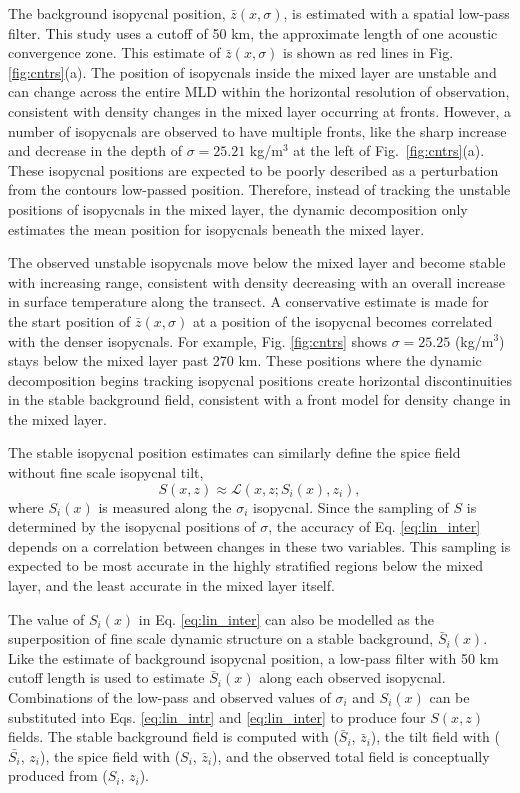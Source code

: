 \documentclass[preprint,NumberedRefs]{JASA}
\begin{document}
The background isopycnal position, $\bar{z}(x, \sigma)$, is estimated with a spatial low-pass filter. This study uses a cutoff of 50 km, the approximate length of one acoustic convergence zone\cite{jensen2011computational}. This estimate of $\bar{z}(x, \sigma)$ is shown as red lines in Fig. \ref{fig:cntrs}(a). The position of isopycnals inside the mixed layer are unstable and can change across the entire MLD within the horizontal resolution of observation, consistent with density changes in the mixed layer occurring at fronts. However, a number of isopycnals are observed to have multiple fronts, like the sharp increase and decrease in the depth of $\sigma=25.21$ kg/m$^3$ at the left of Fig.~\ref{fig:cntrs}(a). These isopycnal positions are expected to be poorly described as a perturbation from the contours low-passed position. Therefore, instead of tracking the unstable positions of isopycnals in the mixed layer, the dynamic decomposition only estimates the mean position for isopycnals beneath the mixed layer.

The observed unstable isopycnals move below the mixed layer and become stable with increasing range, consistent with density decreasing with an overall increase in surface temperature along the transect. A conservative estimate is made for the start position of $\bar{z}(x, \sigma)$ at a position of the isopycnal becomes correlated with the denser isopycnals. For example, Fig. \ref{fig:cntrs} shows $\sigma=25.25$ (kg/m$^3$) stays below the mixed layer past 270 km. These positions where the dynamic decomposition begins tracking isopycnal positions create horizontal discontinuities in the stable background field, consistent with a front model for density change in the mixed layer.

The stable isopycnal position estimates can similarly define the spice field without fine scale isopycnal tilt,
\begin{equation}
    S(x, z)\approx\mathcal{L}(x, z; S_i(x), z_i),
    \label{eq:lin_inter}
\end{equation}
where $S_i(x)$ is measured along the $\sigma_i$ isopycnal. Since the sampling of $S$ is determined by the isopycnal positions of $\sigma$, the accuracy of Eq. \eqref{eq:lin_inter} depends on a correlation between changes in these two variables. This sampling is expected to be most accurate in the highly stratified regions below the mixed layer, and the least accurate in the mixed layer itself.

The value of $S_i(x)$ in Eq. \eqref{eq:lin_inter} can also be modelled as the superposition of fine scale dynamic structure on a stable background, $\bar{S}_i(x)$. Like the estimate of background isopycnal position, a low-pass filter with 50 km cutoff length is used to estimate $\bar{S}_i(x)$ along each observed isopycnal. Combinations of the low-pass and observed values of $\sigma_i$ and $S_i(x)$ can be substituted into Eqs. \eqref{eq:lin_intr} and \eqref{eq:lin_inter} to produce four $S(x,z)$ fields. The stable background field is computed with ($\bar{S}_i$, $\bar{z}_i$), the tilt field with ($\bar{S_i}$, $z_i$), the spice field with ($S_i$, $\bar{z}_i$), and the observed total field is conceptually produced from ($S_i$, $z_i$).
\end{document}
